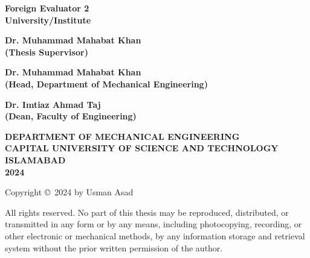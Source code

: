 \documentclass
[a4paper, 12pt, oneside]{Thesis}  %
\begin{document}
\vspace{0.5cm}

\begin{center}
\textbf{Foreign Evaluator 2}\\
\textbf{University/Institute}
\end{center}

\vspace{0.5cm}

\begin{center}
\textbf{Dr. Muhammad Mahabat Khan}\\
\textbf{(Thesis Supervisor)}
\end{center}

\vspace{0.5cm}

\begin{center}
\textbf{Dr. Muhammad Mahabat Khan}\\
\textbf{(Head, Department of Mechanical Engineering)}
\end{center}

\vspace{0.5cm}

\begin{center}
\textbf{Dr. Imtiaz Ahmad Taj}\\
\textbf{(Dean, Faculty of Engineering)}
\end{center}

\vspace{2cm}

\begin{center}
\textbf{DEPARTMENT OF MECHANICAL ENGINEERING\\
CAPITAL UNIVERSITY OF SCIENCE AND TECHNOLOGY\\
ISLAMABAD\\
2024}
\end{center}

\clearpage


\pagestyle{fancy}

\begin{center}
\large{Copyright \copyright~2024 by Usman Asad}
\end{center}

All rights reserved. No part of this thesis may be reproduced, distributed, or transmitted in any form or by any means, including photocopying, recording, or other electronic or mechanical methods, by any information storage and retrieval system without the prior written permission of the author.

\clearpage
\end{document}
